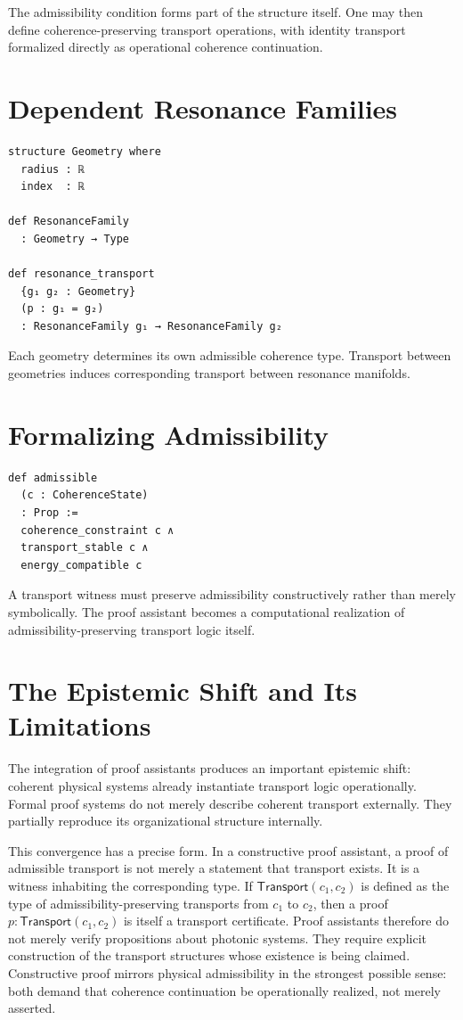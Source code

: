 \documentclass[11pt,openany]{book}
\theoremstyle{definition}
\theoremstyle{plain}
\begin{document}
The admissibility condition forms part of the structure itself. One may then define coherence-preserving transport operations, with identity transport formalized directly as operational coherence continuation.

\section{Dependent Resonance Families}

\begin{verbatim}
structure Geometry where
  radius : ℝ
  index  : ℝ

def ResonanceFamily
  : Geometry → Type

def resonance_transport
  {g₁ g₂ : Geometry}
  (p : g₁ = g₂)
  : ResonanceFamily g₁ → ResonanceFamily g₂
\end{verbatim}

Each geometry determines its own admissible coherence type. Transport between geometries induces corresponding transport between resonance manifolds.

\section{Formalizing Admissibility}

\begin{verbatim}
def admissible
  (c : CoherenceState)
  : Prop :=
  coherence_constraint c ∧
  transport_stable c ∧
  energy_compatible c
\end{verbatim}

A transport witness must preserve admissibility constructively rather than merely symbolically. The proof assistant becomes a computational realization of admissibility-preserving transport logic itself.

\section{The Epistemic Shift and Its Limitations}

The integration of proof assistants produces an important epistemic shift: coherent physical systems already instantiate transport logic operationally. Formal proof systems do not merely describe coherent transport externally. They partially reproduce its organizational structure internally.

This convergence has a precise form. In a constructive proof assistant, a proof of admissible transport is not merely a statement that transport exists. It is a witness inhabiting the corresponding type. If $\mathsf{Transport}(c_1,c_2)$ is defined as the type of admissibility-preserving transports from $c_1$ to $c_2$, then a proof $p : \mathsf{Transport}(c_1,c_2)$ is itself a transport certificate. Proof assistants therefore do not merely verify propositions about photonic systems. They require explicit construction of the transport structures whose existence is being claimed. Constructive proof mirrors physical admissibility in the strongest possible sense: both demand that coherence continuation be operationally realized, not merely asserted.
\end{document}
